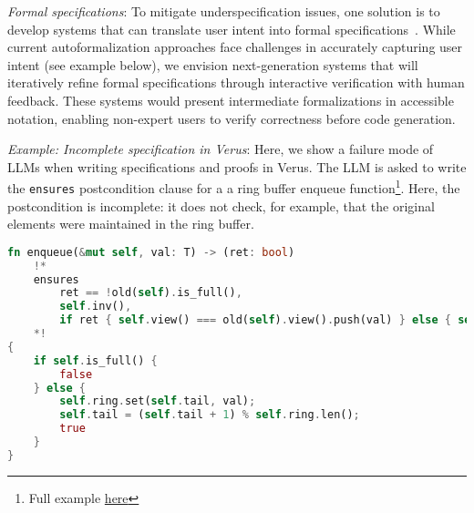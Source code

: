 
\textit{Formal specifications}: To mitigate underspecification issues, one solution is to develop systems that can translate user intent into formal specifications~\citep{szegedy2020promising, endres2024can}. While current autoformalization approaches face challenges in accurately capturing user intent (see example below), we envision next-generation systems that will iteratively refine formal specifications through interactive verification with human feedback. These systems would present intermediate formalizations in accessible notation, enabling non-expert users to verify correctness before code generation. %



\begin{tcolorbox}[colback=lightblue, boxrule=0pt, arc=5pt, outer arc=5pt, after skip=10pt plus 2pt]
\textit{Example: Incomplete specification in Verus}: Here, we show a failure mode of LLMs when writing specifications and proofs in Verus. The LLM is asked to write the \texttt{ensures} postcondition clause for a a ring buffer enqueue function\footnote{Full example \href{https://github.com/microsoft/verus-proof-synthesis/blob/main/benchmarks/interprocedural/tock/verified/rb1.rs\#L270-L297}{here}}. Here, the postcondition is incomplete: it does not check, for example, that the original elements were maintained in the ring buffer.

\begin{lstlisting}[label={lst:verus-spec}, captionpos=t, breaklines=true, language=Rust, style=mystyle]
fn enqueue(&mut self, val: T) -> (ret: bool)
    !*
    ensures
        ret == !old(self).is_full(),
        self.inv(),
        if ret { self.view() === old(self).view().push(val) } else { self.view() === old(self).view() }
    *!
{
    if self.is_full() {
        false
    } else {
        self.ring.set(self.tail, val);
        self.tail = (self.tail + 1) % self.ring.len();
        true
    }
}
\end{lstlisting}
\end{tcolorbox}

